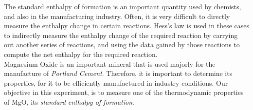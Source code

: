 The standard enthalpy of formation is an important quantity used by chemists, and also in the manufacturing industry. Often, it is very difficult to directly measure the enthalpy change in certain reactions. Hess's law is used in these cases to indirectly measure the enthalpy change of the required reaction by carrying out another series of reactions, and using the data gained by those reactions to compute the net enthalpy for the required reaction.
\\
Magnesium Oxide is an important mineral that is used majorly for the manufacture of \emph{Portland Cement}. Therefore, it is important to determine its properties, for it to be efficiently manufactured in industry conditions. Our objective in this experiment, is to measure one of the thermodynamic properties of MgO, its \emph{standard enthalpy of formation}.
